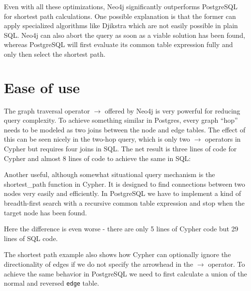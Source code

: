 \documentclass[11pt, a4paper,oneside,chapterprefix=false]{scrbook}
\begin{document}
Even with all these optimizations, Neo4j significantly outperforms PostgreSQL for shortest path calculations.
One possible explanation is that the former can apply specialized algorithms like Djikstra \cite{dijkstra} which are not easily possible in plain SQL. Neo4j can also abort the query as soon as a viable solution has been found, whereas PostgreSQL will first evaluate its common table expression fully and only then select the shortest path.

\section{Ease of use} \label{sec:convenience}

The graph traversal operator $\rightarrow$ offered by Neo4j is very powerful for reducing query complexity.
To achieve something similar in Postgres, every graph ``hop'' needs to be modeled as two joins between the node and edge tables. The effect of this can be seen nicely in the two-hop query, which is only two $\rightarrow$ operators in Cypher but requires four joins in SQL. The net result is three lines of code for Cypher and almost 8 lines of code to achieve the same in SQL:



Another useful, although somewhat situational query mechanism is the shortest\_path function in Cypher.
It is designed to find connections between two nodes very easily and efficiently.
In PostgreSQL we have to implement a kind of breadth-first search with a recursive common table expression and stop when the target node has been found.



Here the difference is even worse - there are only 5 lines of Cypher code but 29 lines of SQL code.

The shortest path example also shows how Cypher can optionally ignore the directionality of edges if we do not specify the arrowhead in the $\rightarrow$ operator.
To achieve the same behavior in PostgreSQL we need to first calculate a union of the normal and reversed \lstinline{edge} table.



\end{document}
